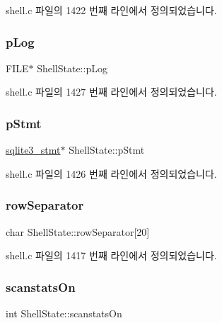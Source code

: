 shell.\+c 파일의 1422 번째 라인에서 정의되었습니다.

\mbox{\label{struct_shell_state_a9ca42a0d7bf19e576de8ea13ba40b61c}} 
\subsubsection{\texorpdfstring{p\+Log}{pLog}}
{\footnotesize\ttfamily F\+I\+LE$\ast$ Shell\+State\+::p\+Log}



shell.\+c 파일의 1427 번째 라인에서 정의되었습니다.

\mbox{\label{struct_shell_state_a443b930c7001c9b669728b917c2f5587}} 
\subsubsection{\texorpdfstring{p\+Stmt}{pStmt}}
{\footnotesize\ttfamily \hyperlink{sqlite3_8h_af2a033da1327cdd77f0a174a09aedd0c}{sqlite3\+\_\+stmt}$\ast$ Shell\+State\+::p\+Stmt}



shell.\+c 파일의 1426 번째 라인에서 정의되었습니다.

\mbox{\label{struct_shell_state_a576a4b6fd62786683bafb6c7631eae6f}} 
\subsubsection{\texorpdfstring{row\+Separator}{rowSeparator}}
{\footnotesize\ttfamily char Shell\+State\+::row\+Separator\mbox{[}20\mbox{]}}



shell.\+c 파일의 1417 번째 라인에서 정의되었습니다.

\mbox{\label{struct_shell_state_aac5055c5404f54e65f52dfdab67cc49d}} 
\subsubsection{\texorpdfstring{scanstats\+On}{scanstatsOn}}
{\footnotesize\ttfamily int Shell\+State\+::scanstats\+On}



